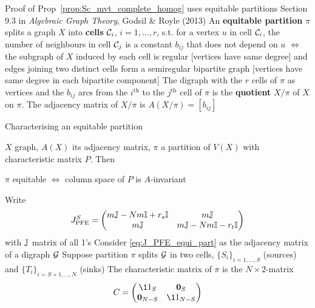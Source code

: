 \documentclass[aspectratio=169]{beamer}
\begin{document}
	
\begin{frame}{Proof of Prop~\ref{prop:Sc_mvt_complete_homog} uses equitable partitions}
	Section 9.3 in \emph{Algebraic Graph Theory}, Godsil \& Royle (2013) 
	\vfill
	An \textbf{equitable partition} $\pi$ splits a graph $X$ into \textbf{cells} $\mathcal{C}_i$, $i=1,\ldots,r$, s.t. for a vertex $u$ in cell $\mathcal{C}_i$, the number of neighbours in cell $\mathcal{C}_j$ is a constant $b_{ij}$ that does not depend on $u$ 
	\vfill
	$\iff$ the subgraph of $X$ induced by each cell is regular [vertices have same degree] and edges joining two distinct cells form a semiregular bipartite graph [vertices have same degree in each bipartite component]
	\vfill
	The digraph with the $r$ cells of $\pi$ as vertices and the $b_{ij}$ arcs from the $i^{\textrm{th}}$ to the $j^{\textrm{th}}$ cell of $\pi$ is the \textbf{quotient} $X/\pi$ of $X$ on $\pi$. The adjacency matrix of $X/\pi$ is $A(X/\pi)=[b_{ij}]$
\end{frame}

\begin{frame}{Characterising an equitable partition}
\begin{lemma}
	$X$ graph, $A(X)$ its adjacency matrix, $\pi$ a partition of $V(X)$ with characteristic matrix $P$. Then
	\begin{center}
		$\pi$ equitable $\iff$ column space of $P$ is $A$-invariant
	\end{center}
\end{lemma}
\end{frame}

\begin{frame}
	Write
	\begin{equation}\label{eq:J_PFE_equi_part}
	J_{\textrm{PFE}}^S = \begin{pmatrix}
		m\mathbb{J} - Nm\mathbb{I} + r_s\mathbb{I} & m \mathbb{J} \\
		m\mathbb{J} & m\mathbb{J} - Nm\mathbb{I} - r_t\mathbb{I}
	\end{pmatrix}
	\end{equation}
	with $\mathbb{J}$ matrix of all 1's
	\vfill
	Consider \eqref{eq:J_PFE_equi_part} as the adjacency matrix of a digraph $\mathcal{G}$
	\vfill
	Suppose partition $\pi$ splits $\mathcal{G}$ in two cells, $\{S_i\}_{i=1,\ldots,S}$ (sources) and $\{T_i\}_{i=S+1,\ldots,N}$ (sinks)
	\vfill
	The characteristic matrix of $\pi$ is the $N\times 2$-matrix
	\[
		C = 
		\begin{pmatrix}
		\11_S & \b0_S \\
		\b0_{N-S} & \11_{N-S}
		\end{pmatrix}
	\]
\end{frame}
\end{document}

